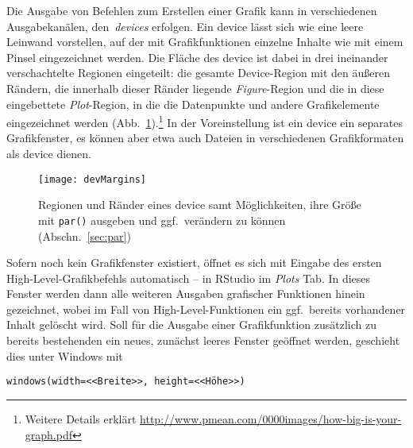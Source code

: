 Die Ausgabe von Befehlen zum Erstellen einer Grafik kann in verschiedenen Ausgabekanälen, den\ \emph{devices} erfolgen. Ein device lässt sich wie eine leere Leinwand vorstellen, auf der mit Grafikfunktionen einzelne Inhalte wie mit einem Pinsel eingezeichnet werden. Die Fläche des device ist dabei in drei ineinander verschachtelte Regionen eingeteilt: die gesamte Device-Region mit den äußeren Rändern, die innerhalb dieser Ränder liegende \emph{Figure}-Region und die in diese eingebettete \emph{Plot}-Region, in die die Datenpunkte und andere Grafikelemente eingezeichnet werden (Abb.\ \ref{fig:margins}).\footnote{Weitere Details erklärt \url{http://www.pmean.com/0000images/how-big-is-your-graph.pdf}} In der Voreinstellung ist ein device ein separates Grafikfenster, es können aber etwa auch Dateien in verschiedenen Grafikformaten als device dienen.

\begin{figure}[ht]
\centering
\texttt{[image: devMargins]}
\vspace*{-0.5em}
\caption{Regionen und Ränder eines device samt Möglichkeiten, ihre Größe mit \lstinline!par()! ausgeben und ggf.\ verändern zu können (Abschn.\ \ref{sec:par})}
\label{fig:margins}
\end{figure}

Sofern noch kein Grafikfenster existiert, öffnet es sich mit Eingabe des ersten High-Level-Grafikbefehls automatisch -- in RStudio im \emph{Plots} Tab. In dieses Fenster werden dann alle weiteren Ausgaben grafischer Funktionen hinein gezeichnet, wobei im Fall von High-Level-Funktionen ein ggf.\ bereits vorhandener Inhalt gelöscht wird. Soll für die Ausgabe einer Grafikfunktion zusätzlich zu bereits bestehenden ein neues, zunächst leeres Fenster geöffnet werden, geschieht dies unter Windows mit
\begin{lstlisting}
windows(width=<<Breite>>, height=<<Höhe>>)
\end{lstlisting}

